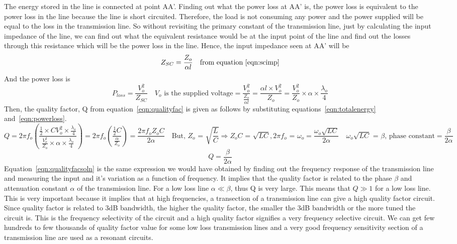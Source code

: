 The energy stored in the line is connected at point AA'. Finding out what the power loss at AA' is, the power loss is equivalent to the power loss in the line because the line is short circuited. Therefore, the load is not consuming any power and the power supplied will be equal to the loss in the transmission line. So without revisiting the primary constant of the transmission line, just by calculating the input impedance of the line, we can find out what the equivalent resistance would be at the input point of the line and find out the losses through this resistance which will be the power loss in the line. Hence, the input impedance seen at AA' will be
\begin{equation*}
Z_{SC} = \frac{Z_{o}}{\alpha l}\quad\text{from equation~\eqref{eqn:scimp}}
\end{equation*}
And the power loss is
\begin{dmath}
P_{loss} = \frac{V_{o}^{2}}{Z_{SC}}\quad V_{o}\text{ is the supplied voltage}
= \frac{V_{o}^{2}}{\frac{Z_{o}}{\alpha l}}
= \frac{\alpha l\times V_o^2}{Z_o}
= \frac{V_{o}^{2}}{Z_{o}}\times\alpha \times\frac{\lambda_{o}}{4}
\label{eqn:powerloss}
\end{dmath}
Then, the quality factor, Q from equation~\eqref{eqn:qualityfac} is given as follows by substituting equations~\eqref{eqn:totalenergy} and~\eqref{eqn:powerloss}.
\begin{dmath*}
Q = 2 \pi f_{o}\left(\frac{\frac{1}{2}\times CV_{o}^{2}\times\frac{\lambda_{o}}{4}}{\frac{V_{o}^{2}}{Z_{o}}\times\alpha \times\frac{\lambda_{o}}{4}}\right)
= 2 \pi f_{o}\left(\frac{\frac{1}{2}C}{\frac{\alpha}{Z_{o}}}\right)
= \frac{2 \pi f_{o} Z_{o}C}{2\alpha}\quad\text{But, }Z_{o}\text{ = }\sqrt{\frac{L}{C}}\Rightarrow Z_{o}C\text{ = }\sqrt{LC}, 2\pi f_{o}\text{ = }\omega_{o}
= \frac{\omega_{o}\sqrt{LC}}{2 \alpha}\quad\omega_{o}\sqrt{LC}\text{ = }\beta\text{, phase constant}
= \frac{\beta}{2 \alpha}
\end{dmath*}
\begin{equation}
Q = \frac{\beta}{2 \alpha}
\label{eqn:qualityfacsoln}
\end{equation}
Equation~\eqref{eqn:qualityfacsoln} is the same expression we would have obtained by finding out the frequency response of the transmission line and measuring the input and it's variation as a function of frequency. It implies that the quality factor is related to the phase $\beta$ and attenuation constant $ \alpha$ of the transmission line. For a low loss line $ \alpha \ll \beta$, thus Q is very large. This means that $Q \gg 1$ for a low loss line. This is very important because it implies that at high frequencies, a transection of a transmission line can give a high quality factor circuit. Since quality factor is related to 3dB bandwidth, the higher the quality factor, the smaller the 3dB bandwidth or the more tuned the circuit is. This is the frequency selectivity of the circuit and a high quality factor signifies a very frequency selective circuit. We can get few hundreds to few thousands of quality factor value for some low loss transmission lines and a very good frequency sensitivity section of a transmission line are used as a resonant circuits.

